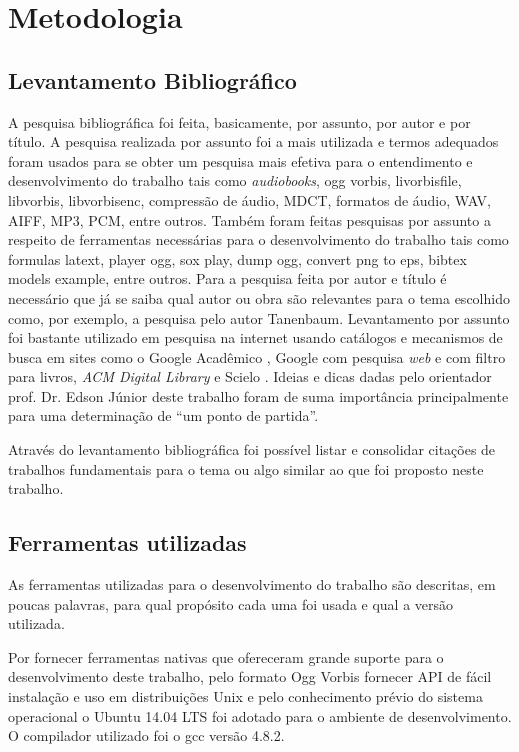 \chapter[Metodologia]{Metodologia}\label{cap4}

\section{Levantamento Bibliográfico}

A pesquisa bibliográfica foi feita, basicamente, por assunto, por autor e por título. A pesquisa realizada por assunto foi a mais utilizada e termos adequados foram usados para se obter um pesquisa mais efetiva para o entendimento e desenvolvimento do trabalho tais como \textit{audiobooks}, ogg vorbis, livorbisfile, libvorbis, libvorbisenc, compressão de áudio, MDCT, formatos de áudio, WAV, AIFF, MP3, PCM, entre outros. Também foram feitas pesquisas por assunto a respeito de ferramentas necessárias para o desenvolvimento do trabalho tais como formulas latext, player ogg, sox play, dump ogg, convert png to eps, bibtex models example, entre outros. Para a pesquisa feita por autor e título é necessário que já se saiba qual autor ou obra são relevantes para o tema escolhido como, por exemplo, a pesquisa pelo autor Tanenbaum. Levantamento por assunto foi bastante utilizado em pesquisa na internet usando catálogos e mecanismos de busca em sites como o Google Acadêmico \cite{googleacademico}, Google com pesquisa \textit{web} e com filtro para livros, \textit{ACM Digital Library} \cite{acm} e Scielo \cite{scielo}. Ideias e dicas dadas pelo orientador prof. Dr. Edson Júnior deste trabalho foram de suma importância principalmente para uma determinação de ``um ponto de partida''.

Através do levantamento bibliográfica foi possível listar e consolidar citações de trabalhos fundamentais para o tema ou algo similar ao que foi proposto neste trabalho. 

\section{Ferramentas utilizadas}

As ferramentas utilizadas para o desenvolvimento do trabalho são descritas, em poucas palavras, para qual propósito cada uma foi usada e qual a versão utilizada.

Por fornecer ferramentas nativas que ofereceram grande suporte para o desenvolvimento deste trabalho, pelo formato Ogg Vorbis fornecer API de fácil instalação e uso em distribuições Unix e pelo conhecimento prévio do sistema operacional o Ubuntu 14.04 LTS foi adotado para o ambiente de desenvolvimento. O compilador utilizado foi o gcc versão 4.8.2.

